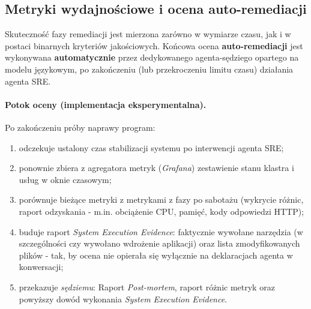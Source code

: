 \subsection{Metryki wydajnościowe i ocena auto-remediacji}
Skuteczność fazy remediacji jest mierzona zarówno w wymiarze czasu, jak i w postaci binarnych kryteriów jakościowych. Końcowa ocena \textbf{auto-remediacji} jest wykonywana \textbf{automatycznie} przez dedykowanego agenta-sędziego opartego na modelu językowym, po zakończeniu (lub przekroczeniu limitu czasu) działania agenta SRE.

\paragraph{Potok oceny (implementacja eksperymentalna).}
Po zakończeniu próby naprawy program:
\begin{enumerate}
    \item odczekuje ustalony czas stabilizacji systemu po interwencji agenta SRE;
    \item ponownie zbiera z agregatora metryk (\textit{Grafana}) zestawienie stanu klastra i usług w oknie czasowym;
    \item porównuje bieżące metryki z metrykami z fazy po sabotażu (wykrycie różnic, raport odzyskania - m.in. obciążenie CPU, pamięć, kody odpowiedzi HTTP);
    \item buduje raport \textit{System Execution Evidence}: faktycznie wywołane narzędzia (w szczególności czy wywołano wdrożenie aplikacji) oraz lista zmodyfikowanych plików - tak, by ocena nie opierała się wyłącznie na deklaracjach agenta w konwersacji;
    \item przekazuje \textit{sędziemu}: Raport \textit{Post-mortem}, raport różnic metryk oraz powyższy dowód wykonania \textit{System Execution Evidence}.
\end{enumerate}

